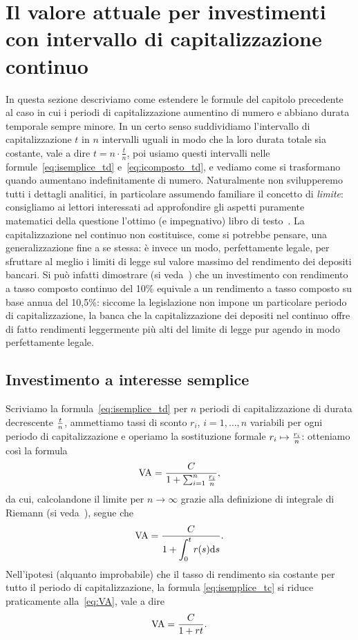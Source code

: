 \section[Intervallo di capitalizzazione continuo]{Il valore attuale per investimenti con intervallo di capitalizzazione continuo}
\label{sec:tcontinui}
In questa sezione descriviamo come estendere le formule del capitolo precedente al caso in cui i periodi di capitalizzazione
aumentino di numero e abbiano durata temporale sempre minore. In un certo senso suddividiamo l'intervallo di capitalizzazione
$t$ in $n$ intervalli uguali in modo che la loro durata totale sia costante, vale a dire $ t=n\cdot\frac{t}{n}$, poi usiamo
questi intervalli nelle formule~\eqref{eq:isemplice_td} e~\eqref{eq:icomposto_td}, e vediamo come si trasformano quando aumentano
indefinitamente di numero. Naturalmente non svilupperemo tutti i dettagli analitici, in particolare assumendo familiare il concetto
di \emph{limite}: consigliamo ai lettori interessati ad approfondire gli aspetti puramente matematici della questione l'ottimo
(e impegnativo) libro di testo~\cite{Fischer1983}.\newline
La capitalizzazione nel continuo non costituisce, come si potrebbe pensare, una generalizzazione fine a se stessa: è invece
un modo, perfettamente legale, per sfruttare al meglio i limiti di legge sul valore massimo del rendimento dei depositi bancari.
Si può infatti dimostrare (si veda~\cite[§3.3.1, p. 45, esempio 1]{brealey_et_al1999}) che un investimento con rendimento
a tasso composto continuo del 10\% equivale a un rendimento a tasso composto su base annua del 10,5\%: siccome la legislazione
non impone un particolare periodo di capitalizzazione, la banca che la capitalizzazione dei depositi nel continuo offre di fatto
rendimenti leggermente più alti del limite di legge pur agendo in modo perfettamente legale.


\subsection{Investimento a interesse semplice}
\label{sec:isemplice_tc}

Scriviamo la formula~\eqref{eq:isemplice_td} per $n$ periodi di capitalizzazione di durata decrescente $t\over n$, 
ammettiamo tassi di sconto $r_i$, $i= 1, \ldots, n$ variabili per ogni periodo di capitalizzazione e operiamo la sostituzione
formale $r_i\mapsto {r_i\over n}$: otteniamo così la formula
\[
    \mathrm{VA}=\frac{C}{1+\sum_{i=1}^n\frac{r_i}{n}},
\]
da cui, calcolandone il limite per $n\to \infty$ grazie alla definizione di integrale di Riemann
(si veda~\cite[chapter , §.4, pp.~629--638]{Fischer1983}), segue che
\begin{equation}
  \label{eq:isemplice_tc}
  \mathrm{VA}=\frac{C}{\displaystyle{1+\int_{0}^tr(s)\mathrm{d}s}}.
\end{equation}
Nell'ipotesi (alquanto improbabile) che il tasso di rendimento sia costante per tutto il periodo di capitalizzazione,
la formula \eqref{eq:isemplice_tc} si riduce praticamente alla~\eqref{eq:VA}, vale a dire
\[
  \mathrm{VA}=\frac{C}{1+rt}.
\]

